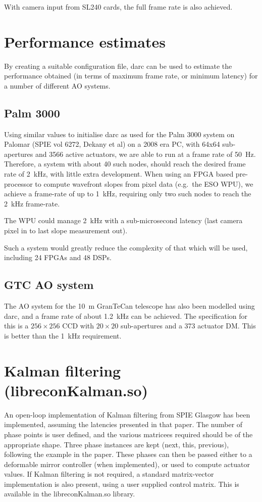 \documentclass[a4,10pt]{article}
\begin{document}
With camera input from SL240 cards, the full frame rate is also achieved.


\section{Performance estimates}
By creating a suitable configuration file, darc can be used to
estimate the performance obtained (in terms of maximum frame rate, or
minimum latency) for a number of different AO systems.

\subsection{Palm 3000}
Using similar values to initialise darc as used for the Palm 3000
system on Palomar (SPIE vol 6272, Dekany et al) on a 2008 era PC,
with 64x64 sub-apertures and 3566 active actuators, we are able to run
at a frame rate of 50~Hz.  Therefore, a system with about 40 such
nodes, should reach the desired frame rate of 2~kHz, with little extra
development.  When using an FPGA based pre-processor to compute
wavefront slopes from pixel data (e.g.\ the ESO WPU), we achieve a
frame-rate of up to 1~kHz, requiring only two such nodes to reach the
2~kHz frame-rate.

The WPU could manage 2~kHz with a sub-microsecond latency (last camera
pixel in to last slope measurement out).

Such a system would greatly reduce the complexity of that which will
be used, including 24 FPGAs and 48 DSPs.

\subsection{GTC AO system}
The AO system for the 10~m GranTeCan telescope has also been modelled
using darc, and a frame rate of about 1.2~kHz can be achieved.  The
specification for this is a $256\times256$ CCD with $20\times20$
sub-apertures and a 373 actuator DM.  This is better than the 1~kHz
requirement.



\section{Kalman filtering (libreconKalman.so)}
An open-loop implementation of Kalman filtering from SPIE Glasgow has
been implemented, assuming the latencies presented in that paper.  The
number of phase points is user defined, and the various matricees
required should be of the appropriate shape.  Three phase instances
are kept (next, this, previous), following the example in the paper.
These phases can then be passed either to a deformable mirror
controller (when implemented), or used to compute actuator values.  If
Kalman filtering is not required, a standard matrix-vector
implementation is also present, using a user supplied control matrix.
This is available in the libreconKalman.so library.
\end{document}
